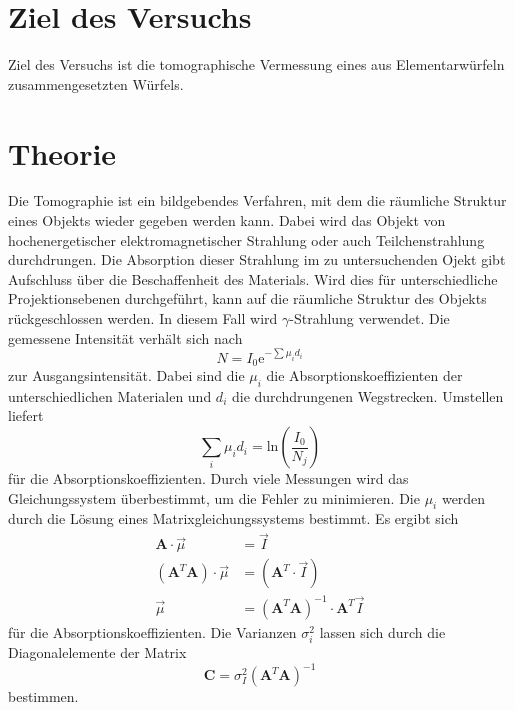 \section{Ziel des Versuchs}
Ziel des Versuchs ist die tomographische Vermessung eines aus Elementarwürfeln zusammengesetzten Würfels.
\section{Theorie}
\label{sec:Theorie}
Die Tomographie ist ein bildgebendes Verfahren, mit dem die räumliche Struktur eines Objekts wieder gegeben werden kann.
Dabei wird das Objekt von hochenergetischer elektromagnetischer Strahlung oder auch Teilchenstrahlung durchdrungen. Die Absorption dieser Strahlung im zu untersuchenden Ojekt gibt Aufschluss über die Beschaffenheit des Materials. Wird dies für unterschiedliche Projektionsebenen durchgeführt, kann auf die räumliche Struktur des Objekts rückgeschlossen werden. In diesem Fall wird $\gamma$-Strahlung verwendet.
Die gemessene Intensität verhält sich nach
\begin{equation}
	N = I_0 \mathup e^{-\sum \mu_i d_i}
	\label{eqn:int}
\end{equation}
zur Ausgangsintensität. Dabei sind die $\mu_i$ die Absorptionskoeffizienten der unterschiedlichen Materialen und $d_i$ die durchdrungenen Wegstrecken.
Umstellen liefert
\begin{equation*}
	\sum_i \mu_i d_i = \mathup{ln}\left(\frac{I_0}{N_j}\right)
\end{equation*}
für die Absorptionskoeffizienten.
Durch viele Messungen wird das Gleichungssystem überbestimmt, um die Fehler zu minimieren.
Die $\mu_i$ werden durch die Lösung eines Matrixgleichungssystems bestimmt.
Es ergibt sich
\begin{align}
	\mathbf{A} \cdot \vec \mu &= \vec I \\
	(\mathbf A^T \mathbf A) \cdot \vec \mu &= (\mathbf A^T \cdot \vec I)\\
	\vec \mu &= (\mathbf A^T \mathbf A)^{-1} \cdot \mathbf A^T \vec I
\end{align}
für die Absorptionskoeffizienten.
Die Varianzen $\sigma_i^2$ lassen sich durch die Diagonalelemente der Matrix
\begin{equation}
	\mathbf C = \sigma_I^2(\mathbf A^T \mathbf A)^{-1}
	\label{eqn:Cii}
\end{equation}
bestimmen.
